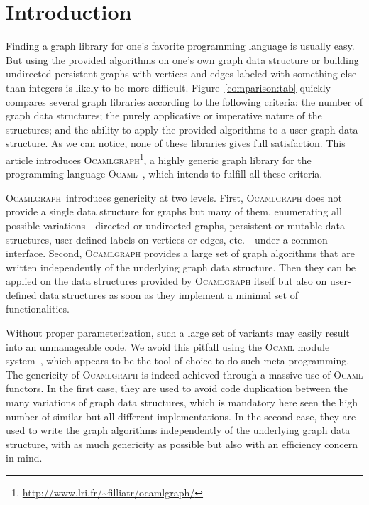\documentclass[tfpsymp]{tfp05symp}
\newcommand{\ocamlgraph}{\textsc{Ocamlgraph}\xspace}
\newcommand{\ocaml}{\textsc{Ocaml}\xspace}
\begin{document}
\section{Introduction}

Finding a graph library for one's favorite programming language is
usually easy. But using the provided algorithms on one's
own graph data structure or building undirected persistent graphs with
vertices and edges labeled with something else than integers is
likely to be more difficult. Figure~\ref{comparison:tab} quickly
compares several graph libraries according to the following criteria: 
the number of graph data structures; the purely applicative or
imperative nature of the structures; and the ability to apply the
provided algorithms to a user graph data structure.
As we can notice, none of these libraries gives full satisfaction.
This article introduces
\ocamlgraph\footnote{\url{http://www.lri.fr/~filliatr/ocamlgraph/}}, a
highly generic graph library for the programming language
\ocaml~\cite{ObjectiveCaml}, which intends to fulfill all 
these criteria.

\ocamlgraph\ introduces genericity at two levels. First, \ocamlgraph
does not provide a single data structure for graphs but many of them,
enumerating all possible variations---directed or undirected graphs,
persistent or mutable data structures, user-defined labels on vertices
or edges, etc.---under a common interface.
Second, \ocamlgraph provides a large set of graph algorithms that are
written independently of the underlying graph data structure. Then
they can be applied on the data structures provided by \ocamlgraph
itself but also on user-defined data structures as soon as they
implement a minimal set of functionalities.

Without proper parameterization, such a large set of variants may
easily result into an unmanageable code. We avoid this pitfall
using the \ocaml module system~\cite{leroy00}, which
appears to be the tool of choice to do such meta-programming. 
The genericity of \ocamlgraph is indeed achieved through a massive use
of \ocaml functors. In the first case, they are used to avoid code
duplication between the many variations of graph data structures,
which is mandatory here seen the high number of similar but all
different implementations. In the second case, they are used to write
the graph algorithms independently of the underlying graph data
structure, with as much genericity as possible but also with an
efficiency concern in mind. 
\end{document}
